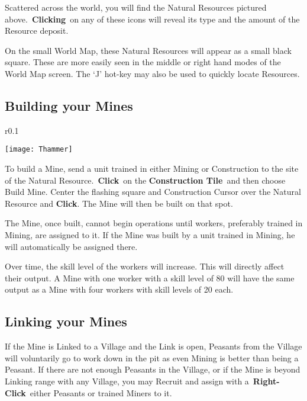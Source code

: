Scattered across the world, you will find the Natural Resources pictured above. \textbf{Clicking} on any of these icons will reveal its type and the amount of the Resource deposit.


On the small World Map, these Natural Resources will appear as a small black square. These are more easily seen in the middle or right hand modes of the World Map screen. The ‘J’ hot-key may also be used to quickly locate Resources.

\subsection{Building your Mines}


\begin{wrapfigure}{r}{0.1\textwidth}
	\vspace{-20pt}
	\begin{center}
		\texttt{[image: Thammer]}
	\end{center}
	\vspace{-20pt}
\end{wrapfigure}

To build a Mine, send a unit trained in either Mining or Construction to the site of the Natural Resource. \textbf{Click} on the \textbf{Construction Tile} and then choose Build Mine. Center the flashing square and Construction Cursor over the Natural Resource and \textbf{Click}. The Mine will then be built on that spot.

The Mine, once built, cannot begin operations until workers, preferably trained in Mining, are assigned to it. If the Mine was built by a unit trained in Mining, he will automatically be assigned there.

Over time, the skill level of the workers will increase. This will directly affect their output. A Mine with one worker with a skill level of 80 will have the same output as a Mine with four workers with skill levels of 20 each.

\subsection{Linking your Mines}


If the Mine is Linked to a Village and the Link is open, Peasants from the Village will voluntarily go to work down in the pit as even Mining is better than being a Peasant. If there are not enough Peasants in the Village, or if the Mine is beyond Linking range with any Village, you may Recruit and assign with a \textbf{Right-Click} either Peasants or trained Miners to it.

